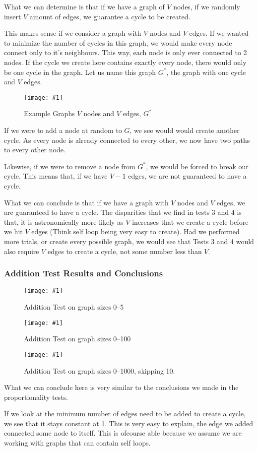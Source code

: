 \documentclass[12pt]{article}
\newcommand{\firgureBuffered}[2]
{
    \begin{figure}[ht!]
        \centering
        \texttt{[image: \#1]}
        \caption{#2}
    \end{figure}
}
\begin{document}
What we can determine is that if we have a graph of $V$ nodes, if we randomly insert $V$ amount of edges, we guarantee a cycle to be created.

This makes sense if we consider a graph with $V$ nodes and $V$ edges. If we wanted to minimize the number of cycles in this graph, we would make every node connect only to it's neighbours. This way, each node is only ever connected to 2 nodes. If the cycle we create here contains exactly every node, there would only be one cycle in the graph.
Let us name this graph $G^{*}$, the graph with one cycle and $V$ edges.

\FloatBarrier{}
\firgureBuffered{images/experiment1/exp1_exp1.png}{Example Graphs $V$ nodes and $V$ edges, $G^{*}$}
\FloatBarrier{}

If we were to add a node at random to $G$, we see would would create another cycle. As every node is already connected to every other, we now have two paths to every other node.

Likewise, if we were to remove a node from $G^{*}$, we would be forced to break our cycle. This means that, if we have $V-1$ edges, we are not guaranteed to have a cycle.

What we can conclude is that if we have a graph with $V$ nodes and $V$ edges, we are guaranteed to have a cycle. The disparities that we find in tests 3 and 4 is that, it is astronomically more likely as $V$ increases that we create a cycle before we hit $V$ edges (Think self loop being very easy to create). Had we performed more trials, or create every possible graph, we would see that Tests 3 and 4 would also require $V$ edges to create a cycle, not some number less than $V$.

\subsubsection{Addition Test Results and Conclusions}

\FloatBarrier{}
\firgureBuffered{images/experiment1/exp1_e.png}{Addition Test on graph sizes 0--5}
\firgureBuffered{images/experiment1/exp1_f.png}{Addition Test on graph sizes 0--100}
\firgureBuffered{images/experiment1/exp1_g.png}{Addition Test on graph sizes 0--1000, skipping 10.}
\FloatBarrier{}

What we can conclude here is very similar to the conclusions we made in the proportionality tests.

If we look at the minimum number of edges need to be added to create a cycle, we see that it stays constant at 1. This is very easy to explain, the edge we added connected some node to itself. This is ofcourse able because we assume we are working with graphs that can contain self loops.
\end{document}
